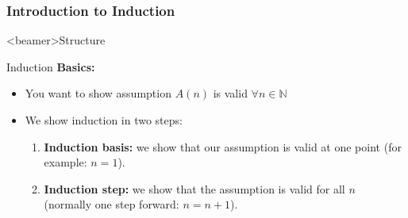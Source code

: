 \subsubsection{Introduction to Induction}

\begin{frame}<beamer>{Structure}
\end{frame}

\begin{frame}{Induction}
  \textbf{Basics:}
  \begin{itemize}
    \item 
      You want to show assumption $A(n)$ is valid $\forall n \in \mathbb{N}$
    \item
      We show induction in two steps:
      \begin{enumerate}
        \item
          \textbf{Induction basis:} we show that our assumption is valid 
          at one point (for example: $n = 1$).
        \item
          \textbf{Induction step:} we show that the assumption is valid for 
          all $n$ (normally one step forward: $n = n + 1$).
      \end{enumerate}
  \end{itemize}
\end{frame}


